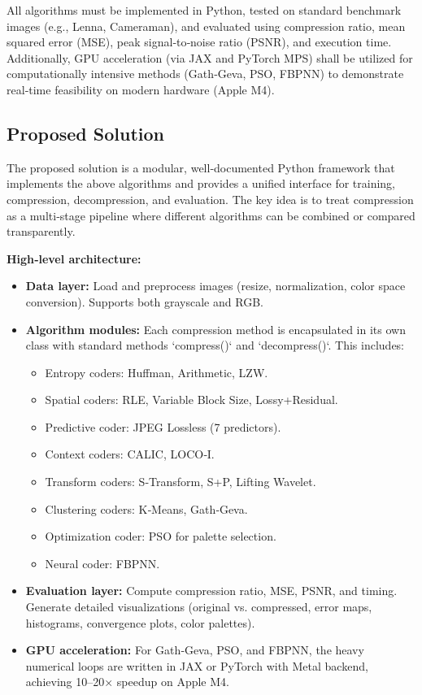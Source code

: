 All algorithms must be implemented in Python, tested on standard benchmark images (e.g., Lenna, Cameraman), and evaluated using compression ratio, mean squared error (MSE), peak signal‑to‑noise ratio (PSNR), and execution time. Additionally, GPU acceleration (via JAX and PyTorch MPS) shall be utilized for computationally intensive methods (Gath‑Geva, PSO, FBPNN) to demonstrate real‑time feasibility on modern hardware (Apple M4).

\subsection{Proposed Solution}

The proposed solution is a modular, well‑documented Python framework that implements the above algorithms and provides a unified interface for training, compression, decompression, and evaluation. The key idea is to treat compression as a multi‑stage pipeline where different algorithms can be combined or compared transparently.

\textbf{High‑level architecture:}
\begin{itemize}
    \item \textbf{Data layer:} Load and preprocess images (resize, normalization, color space conversion). Supports both grayscale and RGB.
    \item \textbf{Algorithm modules:} Each compression method is encapsulated in its own class with standard methods `compress()` and `decompress()`. This includes:
        \begin{itemize}
            \item Entropy coders: Huffman, Arithmetic, LZW.
            \item Spatial coders: RLE, Variable Block Size, Lossy+Residual.
            \item Predictive coder: JPEG Lossless (7 predictors).
            \item Context coders: CALIC, LOCO‑I.
            \item Transform coders: S‑Transform, S+P, Lifting Wavelet.
            \item Clustering coders: K‑Means, Gath‑Geva.
            \item Optimization coder: PSO for palette selection.
            \item Neural coder: FBPNN.
        \end{itemize}
    \item \textbf{Evaluation layer:} Compute compression ratio, MSE, PSNR, and timing. Generate detailed visualizations (original vs. compressed, error maps, histograms, convergence plots, color palettes).
    \item \textbf{GPU acceleration:} For Gath‑Geva, PSO, and FBPNN, the heavy numerical loops are written in JAX or PyTorch with Metal backend, achieving 10–20× speedup on Apple M4.
\end{itemize}

